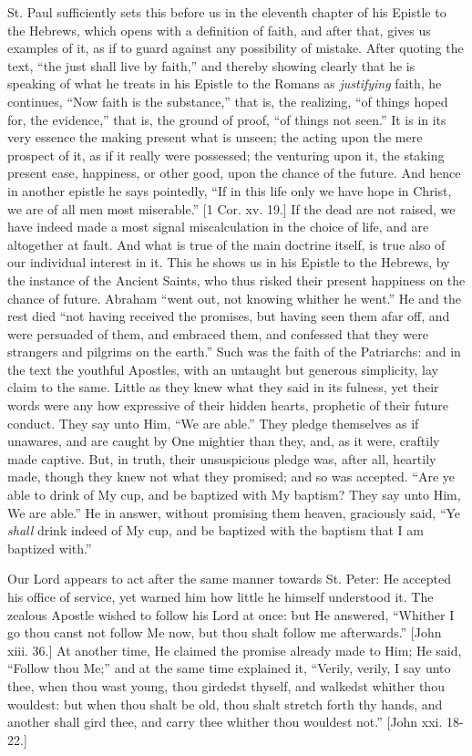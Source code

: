 St. Paul sufficiently sets this before us in the eleventh chapter
of his Epistle to the Hebrews, which opens with a definition of faith,
and after that, gives us examples of it, as if to guard against any
possibility of mistake. After quoting the text, ``the just shall
live by faith,'' and thereby showing clearly that he is speaking
of what he treats in his Epistle to the Romans as \emph{justifying}
faith, he continues, ``Now faith is the substance,'' that is,
the realizing, ``of things hoped for, the evidence,'' that is,
the ground of proof, ``of things not seen.'' It is in its very
essence the making present what is unseen; the acting upon the mere
prospect of it, as if it really were possessed; the venturing upon it,
the staking present ease, happiness, or other good, upon the chance of
the future. And hence in another epistle he says pointedly, ``If
in this life only we have hope in Christ, we are of all men most
miserable.'' [1 Cor. xv. 19.] If the dead are not raised, we have
indeed made a most signal miscalculation in the choice of life, and
are altogether at fault. And what is true of the main doctrine itself,
is true also of our individual interest in it. This he shows us in his
Epistle to the Hebrews, by the instance of the Ancient Saints, who
thus risked their present happiness on the chance of future. Abraham
``went out, not knowing whither he went.'' He and the rest
died ``not having received the promises, but having seen them afar
off, and were persuaded of them, and embraced them, and confessed that
they were strangers and pilgrims on the earth.'' Such was the
faith of the Patriarchs: and in the text the youthful Apostles, with
an untaught but generous simplicity, lay claim to the same. Little as
they knew what they said in its fulness, yet their words were any how
expressive of their hidden hearts, prophetic of their future conduct.
They say unto Him, ``We are able.'' They pledge themselves as
if unawares, and are caught by One mightier than they, and, as it
were, craftily made captive. But, in truth, their unsuspicious pledge
was, after all, heartily made, though they knew not what they
promised; and so was accepted. ``Are ye able to drink of My cup,
and be baptized with My baptism? They say unto Him, We are able.''
He in answer, without promising them heaven, graciously said, ``Ye
\emph{shall} drink indeed of My cup, and be baptized with the baptism
that I am baptized with.''

Our Lord appears to act after the same manner towards St. Peter: He
accepted his office of service, yet warned him how little he himself
understood it. The zealous Apostle wished to follow his Lord at once:
but He answered, ``Whither I go thou canst not follow Me now, but
thou shalt follow me afterwards.'' [John xiii. 36.] At another
time, He claimed the promise already made to Him; He said,
``Follow thou Me;'' and at the same time explained it,
``Verily, verily, I say unto thee, when thou wast young, thou
girdedst thyself, and walkedst whither thou wouldest: but when thou
shalt be old, thou shalt stretch forth thy hands, and another shall
gird thee, and carry thee whither thou wouldest not.'' [John xxi.
18-22.]

